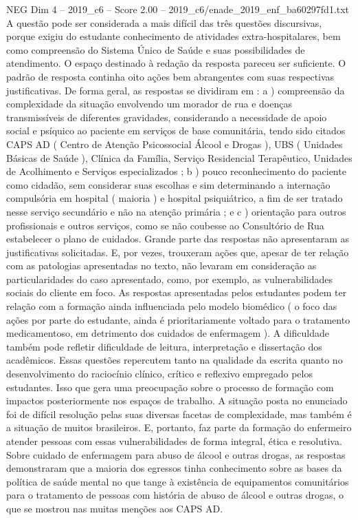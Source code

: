 \begin{textsample}{NEG Dim 4 – 2019\_c6 – Score 2.00 – 2019\_c6/enade\_2019\_enf\_ba60297fd1.txt}
A questão pode ser considerada a mais difícil das três questões discursivas, porque exigiu do estudante conhecimento de atividades extra-hospitalares, bem como compreensão do Sistema Único de Saúde e suas possibilidades de atendimento.
O espaço destinado à redação da resposta pareceu ser suficiente.
O padrão de resposta continha oito ações bem abrangentes com suas respectivas justificativas.
De forma geral, as respostas se dividiram em : a ) compreensão da complexidade da situação envolvendo um morador de rua e doenças transmissíveis de diferentes gravidades, considerando a necessidade de apoio social e psíquico ao paciente em serviços de base comunitária, tendo sido citados CAPS AD ( Centro de Atenção Psicossocial Álcool e Drogas ), UBS ( Unidades Básicas de Saúde ), Clínica da Família, Serviço Residencial Terapêutico, Unidades de Acolhimento e Serviços especializados ; b ) pouco reconhecimento do paciente como cidadão, sem considerar suas escolhas e sim determinando a internação compulsória em hospital ( maioria ) e hospital psiquiátrico, a fim de ser tratado nesse serviço secundário e não na atenção primária ; e c ) orientação para outros profissionais e outros serviços, como se não coubesse ao Consultório de Rua estabelecer o plano de cuidados.
Grande parte das respostas não apresentaram as justificativas solicitadas.
E, por vezes, trouxeram ações que, apesar de ter relação com as patologias apresentadas no texto, não levaram em consideração as particularidades do caso apresentado, como, por exemplo, as vulnerabilidades sociais do cliente em foco.
As respostas apresentadas pelos estudantes podem ter relação com a formação ainda influenciada pelo modelo biomédico ( o foco das ações por parte do estudante, ainda é prioritariamente voltado para o tratamento medicamentoso, em detrimento dos cuidados de enfermagem ).
A dificuldade também pode refletir dificuldade de leitura, interpretação e dissertação dos acadêmicos.
Essas questões repercutem tanto na qualidade da escrita quanto no desenvolvimento do raciocínio clínico, crítico e reflexivo empregado pelos estudantes.
Isso que gera uma preocupação sobre o processo de formação com impactos posteriormente nos espaços de trabalho.
A situação posta no enunciado foi de difícil resolução pelas suas diversas facetas de complexidade, mas também é a situação de muitos brasileiros.
E, portanto, faz parte da formação do enfermeiro atender pessoas com essas vulnerabilidades de forma integral, ética e resolutiva.
Sobre cuidado de enfermagem para abuso de álcool e outras drogas, as respostas demonstraram que a maioria dos egressos tinha conhecimento sobre as bases da política de saúde mental no que tange à existência de equipamentos comunitários para o tratamento de pessoas com história de abuso de álcool e outras drogas, o que se mostrou nas muitas menções aos CAPS AD.

\end{textsample}
